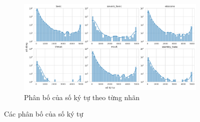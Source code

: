 \begin{figure}[htb]
\begin{subfigure}[t]{0.65\textwidth}
    \end{subfigure}\\
    \begin{subfigure}{\textwidth}
        \centering
        \includegraphics[width=\textwidth]{chapter_2/image/dist_number_of_chars_per_label.png}
        \caption{Phân bố của số ký tự theo từng nhãn}
    \end{subfigure}%
    \caption{Các phân bố của số ký tự}
    \label{figure:dist_number_of_chars}
\end{figure}

